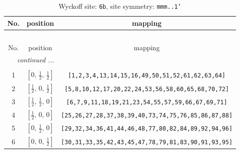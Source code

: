 \documentclass[fleqn,8pt]{jsarticle}
\begin{document}
\begin{longtable}{ccc}
\caption{Wyckoff site: {\tt 6b}, site symmetry: {\tt mmm..1'}}
 \\
 \hline \hline
No. & position & mapping \\ \hline \endfirsthead

\multicolumn{2}{l}{\tablename\ \thetable{}} \\
 \hline \hline
No. & position & mapping \\ \hline \endhead

 \hline \hline
\multicolumn{2}{r}{\footnotesize\it continued ...} \\ \endfoot

 \hline \hline
\multicolumn{2}{r}{} \\ \endlastfoot

1 & $\left[ 0,\, \frac{1}{2},\, \frac{1}{2} \right]$ & {\tt [1,2,3,4,13,14,15,16,49,50,51,52,61,62,63,64]} \\ \hline
2 & $\left[ \frac{1}{2},\, 0,\, \frac{1}{2} \right]$ & {\tt [5,8,10,12,17,20,22,24,53,56,58,60,65,68,70,72]} \\ \hline
3 & $\left[ \frac{1}{2},\, \frac{1}{2},\, 0 \right]$ & {\tt [6,7,9,11,18,19,21,23,54,55,57,59,66,67,69,71]} \\ \hline
4 & $\left[ \frac{1}{2},\, 0,\, 0 \right]$ & {\tt [25,26,27,28,37,38,39,40,73,74,75,76,85,86,87,88]} \\ \hline
5 & $\left[ 0,\, \frac{1}{2},\, 0 \right]$ & {\tt [29,32,34,36,41,44,46,48,77,80,82,84,89,92,94,96]} \\ \hline
6 & $\left[ 0,\, 0,\, \frac{1}{2} \right]$ & {\tt [30,31,33,35,42,43,45,47,78,79,81,83,90,91,93,95]} \\
\end{longtable}
\renewcommand{\arraystretch}{1.2}
\end{document}

